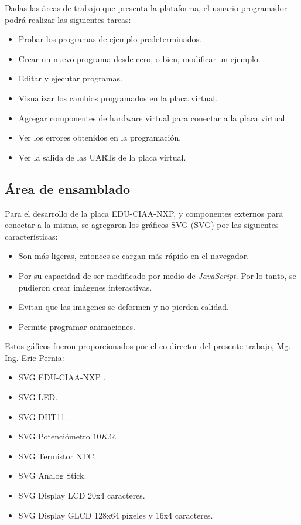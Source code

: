 Dadas las áreas de trabajo que presenta la plataforma, el usuario programador podrá realizar las siguientes tareas:

\begin{itemize}
	\item Probar los programas de ejemplo predeterminados.
	\item Crear un nuevo programa desde cero, o bien, modificar un ejemplo.
	\item Editar y ejecutar programas.
	\item Visualizar los cambios programados en la placa virtual.
	\item Agregar componentes de hardware virtual para conectar a la placa virtual.
	\item Ver los errores obtenidos en la programación.
	\item Ver la salida de las UARTs de la placa virtual.
\end{itemize}

\subsection{Área de ensamblado}

Para el desarrollo de la placa EDU-CIAA-NXP, y componentes externos para conectar a la misma, se agregaron los gráficos SVG (SVG) por las siguientes características:

\begin{itemize}
	\item Son más ligeras, entonces se cargan más rápido en el navegador.
    \item Por su capacidad de ser modificado por medio de \textit{JavaScript}. Por lo tanto, se pudieron crear imágenes interactivas.
	\item Evitan que las imagenes se deformen y no pierden calidad.
	\item Permite programar animaciones.
\end{itemize}

Estos gáficos fueron proporcionados por el co-director del presente trabajo, Mg. Ing. Eric Pernia:

\begin{itemize}
    \item SVG EDU-CIAA-NXP \citep{SVGFirmwareV3}.
    \item SVG LED.
    \item SVG DHT11.
    \item SVG Potenciómetro \(10K\Omega\).
    \item SVG Termistor NTC. 
    \item SVG Analog Stick. 
    \item SVG Display LCD 20x4 caracteres.
    \item SVG Display GLCD 128x64 píxeles y 16x4 caracteres.
\end{itemize}

